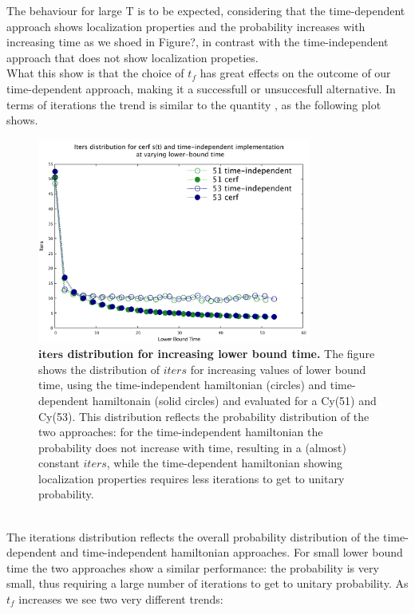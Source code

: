         The behaviour for large T is to be expected, considering that the time-dependent approach shows localization properties and the probability increases with increasing time as we shoed in Figure?, in contrast with the time-independent approach that does not show localization propeties.\\ What this show is that the choice of $t_f$ has great effects on the outcome of our time-dependent approach, making it a successfull or unsuccesfull alternative.
        In terms of iterations the trend is similar to the quantity \quantity, as the following plot shows.
        \begin{figure}[ht]
        \centering
        \includegraphics[width=90mm]{./figures/min_tp/iters.pdf}
        \caption[$iters$ distribution for increasing lower bound time.]{\textbf{$\bm{iters}$ distribution for increasing lower bound time. }The figure shows the distribution of $iters$ for increasing values of lower bound time, using the time-independent hamiltonian (circles) and time-dependent hamiltonain (solid circles) and evaluated for a Cy(51) and Cy(53). This distribution reflects the probability distribution of the two approaches: for the time-independent hamiltonian the probability does not increase with time, resulting in a (almost) constant $iters$, while the time-dependent hamiltonian showing localization properties requires less iterations to get to unitary probability.}
        \label{fig:iters_increasing_time}
        \end{figure} \\
        The iterations distribution reflects the overall probability distribution of the time-dependent and time-independent hamiltonian approaches. For small lower bound time the two approaches show a similar performance: the probability is very small, thus requiring a large number of iterations to get to unitary probability. As $t_f$ increases we see two very different trends:
